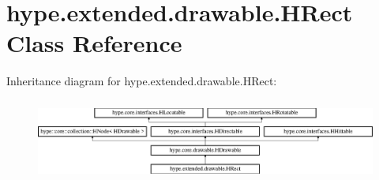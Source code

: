 \hypertarget{classhype_1_1extended_1_1drawable_1_1_h_rect}{\section{hype.\-extended.\-drawable.\-H\-Rect Class Reference}
\label{classhype_1_1extended_1_1drawable_1_1_h_rect}
}
Inheritance diagram for hype.\-extended.\-drawable.\-H\-Rect\-:\begin{figure}[H]
\begin{center}
\leavevmode
\includegraphics[height=2.745098cm]{classhype_1_1extended_1_1drawable_1_1_h_rect}
\end{center}
\end{figure}
